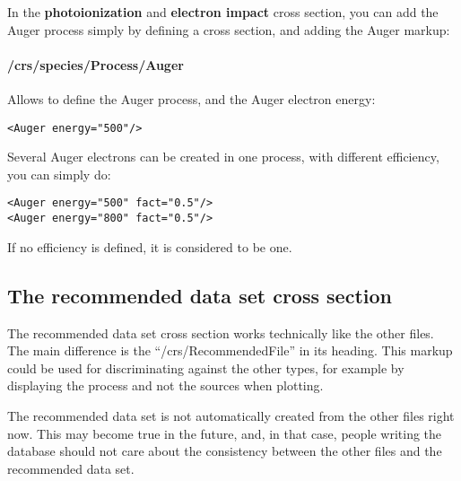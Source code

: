 In the \textbf{photoionization} and \textbf{electron impact} cross section, you can add the Auger process simply by defining a cross section, and adding the Auger markup:

\paragraph{/crs/species/Process/Auger}
Allows to define the Auger process, and the Auger electron energy:
\begin{verbatim}
<Auger energy="500"/>
\end{verbatim}


Several Auger electrons can be created in one process, with different efficiency, you can simply do:

\begin{verbatim}
<Auger energy="500" fact="0.5"/>
<Auger energy="800" fact="0.5"/>
\end{verbatim}

If no efficiency is defined, it is considered to be one.


\subsection{The recommended data set cross section}

The recommended data set cross section works technically like the other files.
The main difference is the ``/crs/RecommendedFile'' in its heading.
This markup could be used for discriminating against the other types, for example by displaying the process and 
not the sources when plotting. 

The recommended data set is not automatically created from the other files right now. This may become true in the future, and, in that case, people writing the database should not care about the consistency between the other files and the recommended data set.










